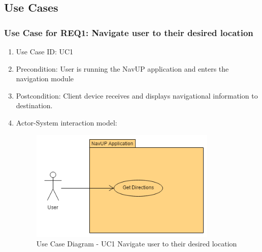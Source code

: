 \documentclass{article}
\begin{document}
%			
%			
%		
\newpage
	\subsection{Use Cases}
	
		\subsubsection{Use Case for REQ1: Navigate user to their desired location}
			\begin{enumerate}
			\renewcommand{\labelenumi}{{\textbf{\arabic{enumi}.}}}
			\item Use Case ID: UC1
			\item Precondition: User is running the NavUP application and enters the navigation module
			\item Postcondition: Client device receives and displays navigational information to destination.
			\item Actor-System interaction model:
				\graphicspath{ {./Diagrams/User/} }
				\begin{figure}[h]
				\caption{Use Case Diagram -  UC1 Navigate user to their desired location}
				\includegraphics[height = 200px]{GetDesiredLocation.png}
				\end{figure}
			\end{enumerate}
\end{document}
